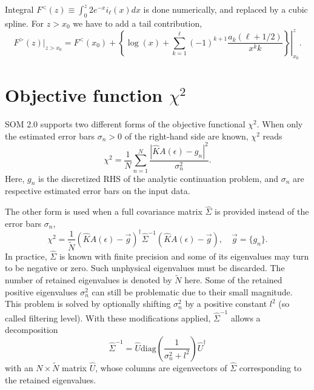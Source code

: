 \documentclass[]{article}
\begin{document}
Integral $F^<(z) \equiv \int_0^z 2 e^{-x} i_\ell(x) dx$ is done numerically,
and replaced by a cubic spline. For $z>x_0$ we have to add a tail contribution,
\begin{equation}
F^>(z)|_{z>x_0} = F^<(x_0) + \left.\left\{
\log(x) + \sum_{k=1}^\ell (-1)^{k+1}\frac{a_k(\ell+1/2)}{x^k k}
\right\}\right|_{x_0}^z.
\end{equation}

\section{Objective function $\chi^2$}
\label{objective_function}

SOM 2.0 supports two different forms of the objective functional $\chi^2$. When only the estimated error bars $\sigma_n > 0$ of the right-hand side are known,
$\chi^2$ reads
\begin{equation}\label{objective_function:chi2}
    \chi^2 = \frac{1}{N} \sum_{n=1}^{N}
    \frac{|\hat K A(\epsilon) - g_n|^2}{\sigma^2_n}.
\end{equation}
Here, $g_n$ is the discretized RHS of the analytic continuation problem, and $\sigma_n$ are respective estimated error bars on the input data.

The other form is used when a full covariance matrix $\hat{\Sigma}$ is provided instead of the error bars $\sigma_n$,
\begin{equation}\label{objective_function:chi2_cov_matrix}
    \chi^2 = \frac{1}{\tilde N}
    (\hat K A(\epsilon) - \vec g)^\dagger
    \hat\Sigma^{-1}
    (\hat K A(\epsilon) - \vec g), \quad \vec g = \{g_n\}.
\end{equation}
In practice, $\hat{\Sigma}$ is known with finite precision and some of its eigenvalues may turn to be negative or zero. Such unphysical eigenvalues must be discarded. The number of retained eigenvalues is denoted by $\tilde N$ here. Some of the retained positive eigenvalues $\sigma_n^2$ can still be problematic due to their small magnitude. This problem is solved by optionally shifting $\sigma_n^2$ by a positive constant $l^2$ (so called filtering level). With these modifications applied, $\hat\Sigma^{-1}$ allows a decomposition
\begin{equation}
    \hat\Sigma^{-1} = \hat U \mathrm{diag}
    \left(\frac{1}{\sigma_n^2 + l^2}\right)
    \hat U^\dagger
\end{equation}
with an $N\times \tilde N$ matrix $\hat U$, whose columns are eigenvectors of $\hat{\Sigma}$ corresponding to the retained eigenvalues.
\end{document}
